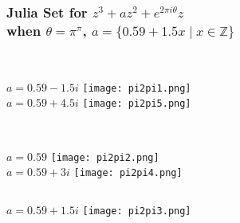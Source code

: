 \documentclass[leqno,handout]{beamer}
\begin{document}
\begin{frame} 
    
\frametitle{Julia Set for $z^{3}+az^2 + e^{2 \pi i \theta}z$ \\ when $\theta=\pi^\pi$, $a=\{0.59+1.5x \mid x \in \mathbb{Z \}}$}
 
\begin{itemize}
\begin{column}{0.3\textwidth}
\begin{center}
    \\$a=0.59-1.5i$
    \texttt{[image: pi2pi1.png]}
    \\$a=0.59+4.5i$
    \texttt{[image: pi2pi5.png]} 
\end{center}
\end{column}
\begin{column}{0.3\textwidth}
\begin{center}
    \\$a=0.59$
    \texttt{[image: pi2pi2.png]} 
    \\$a=0.59+3i$
    \texttt{[image: pi2pi4.png]}
\end{center}
\end{column}
\begin{column}{0.3\textwidth}
    \begin{center}
    $a=0.59+1.5i$
    \texttt{[image: pi2pi3.png]}
    \end{center}
\end{column}
\end{itemize}

\end{frame}
\end{document}
